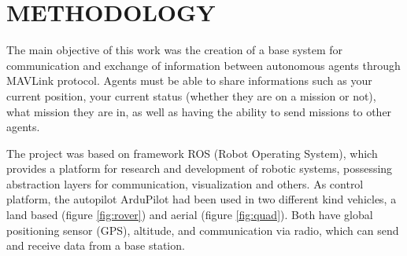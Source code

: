 \section{METHODOLOGY}
\label{sec:methodology}

The main objective of this work was the creation of a base system for communication and exchange of information between autonomous agents through MAVLink protocol.
Agents must be able to share informations such as your current position, your current status (whether they are on a mission or not), what mission they are in, as well as having the ability to send missions to other agents.

The project was based on framework ROS (Robot Operating System), which provides a platform for research and development of robotic systems, possessing abstraction layers for communication, visualization and others.
As control platform, the autopilot ArduPilot had been used in two different kind vehicles, a land based (figure \ref{fig:rover}) and aerial (figure \ref{fig:quad}).
Both have global positioning sensor (GPS), altitude, and communication via radio, which can send and receive data from a base station.

